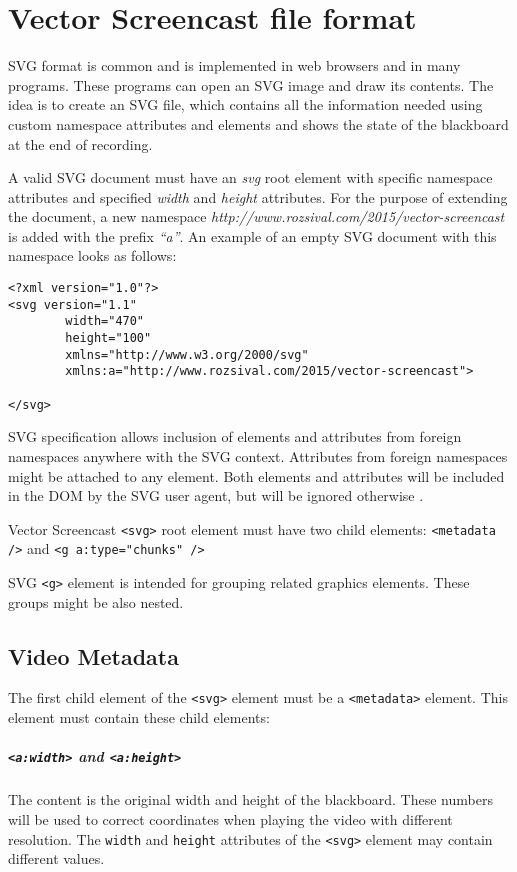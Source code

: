 \chapter{Vector Screencast file format}
\label{c:the-format}

SVG format is common and is implemented in web browsers and in many programs. These programs can open an SVG image and draw its contents. The idea is to create an SVG file, which contains all the information needed using custom namespace attributes and elements and shows the state of the blackboard at the end of recording.

A valid SVG document must have an \textit{svg} root element with specific namespace attributes and specified \textit{width} and \textit{height} attributes. For the purpose of extending the document, a new namespace \textit{http://www.rozsival.com/2015/vector-screencast} is added with the prefix \textit{``a''}. An example of an empty SVG document with this namespace looks as follows:

\begin{lstlisting}
<?xml version="1.0"?>
<svg version="1.1"
        width="470"
        height="100"
        xmlns="http://www.w3.org/2000/svg"
        xmlns:a="http://www.rozsival.com/2015/vector-screencast">

</svg>
\end{lstlisting}

SVG specification allows inclusion of elements and attributes from foreign namespaces anywhere with the SVG context. Attributes from foreign namespaces might be attached to any element. Both elements and attributes will be included in the DOM by the SVG user agent, but will be ignored otherwise \cite{svg_exteding}.

Vector Screencast \verb|<svg>| root element must have two child elements: \verb|<metadata />| and \verb|<g a:type="chunks" />|

SVG \verb|<g>| element is intended for grouping related graphics elements. These groups might be also nested.

\section{Video Metadata}
The first child element of the \verb|<svg>| element must be a \verb|<metadata>| element. This element must contain these child elements:

\paragraph{\texttt{\textless a:width\textgreater} and \texttt{\textless a:height\textgreater}}
The content is the original width and height of the blackboard. These numbers will be used to correct coordinates when playing the video with different resolution. The \verb|width| and \verb|height| attributes of the \verb|<svg>| element may contain different values.

